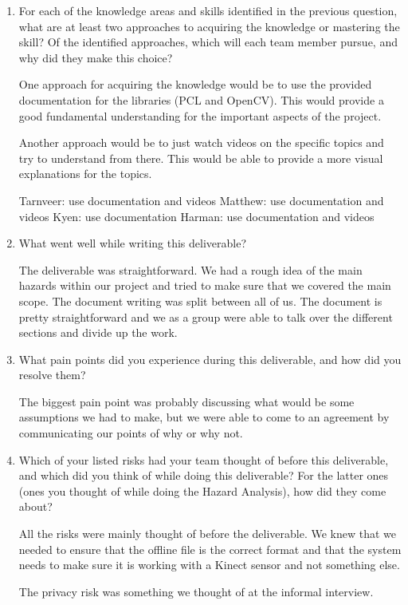 \begin{enumerate}
\item For each of the knowledge areas and skills identified in the previous question, what are at least two approaches to acquiring the knowledge or mastering the skill?  Of the identified approaches, which
will each team member pursue, and why did they make this choice?

One approach for acquiring the knowledge would be to use the provided documentation for the libraries (PCL and OpenCV). This would provide a good fundamental understanding for the important aspects of the project. 

Another approach would be to just watch videos on the specific topics and try to understand from there. This would be able to provide a more visual explanations for the topics.

Tarnveer: use documentation and videos
Matthew: use documentation and videos 
Kyen: use documentation
Harman: use documentation and videos

\item What went well while writing this deliverable? 

The deliverable was straightforward. We had a rough idea of the main hazards within our project and 
tried to make sure that we covered the main scope. The document writing was split between all of us.
The document is pretty straightforward and we as a group were able to talk over the different sections
and divide up the work.

\item What pain points did you experience during this deliverable, and how
did you resolve them?

The biggest pain point was probably discussing what would be some assumptions we had to make, but we were able to come to an agreement by communicating our points of why or why not.

\item Which of your listed risks had your team thought of before this
deliverable, and which did you think of while doing this deliverable? For
the latter ones (ones you thought of while doing the Hazard Analysis), how
did they come about?

All the risks were mainly thought of before the deliverable. We knew that we needed to ensure that the 
offline file is the correct format and that the system needs to make sure it is working with a Kinect sensor and not something else.

The privacy risk was something we thought of at the informal interview.


\end{enumerate}
